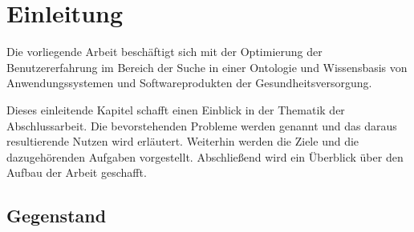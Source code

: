 \chapter{Einleitung}\label{ch:introduction}

Die vorliegende Arbeit beschäftigt sich mit der Optimierung der Benutzererfahrung im Bereich der Suche in einer Ontologie und Wissensbasis von Anwendungssystemen und Softwareprodukten der Gesundheitsversorgung.

Dieses einleitende Kapitel schafft einen Einblick in der Thematik der Abschlussarbeit. 
Die bevorstehenden Probleme werden genannt und das daraus resultierende Nutzen wird erläutert. 
Weiterhin werden die Ziele und die dazugehörenden Aufgaben vorgestellt. 
Abschließend wird ein Überblick über den Aufbau der Arbeit geschafft.

\section{Gegenstand}\label{sec:gegenstand}





